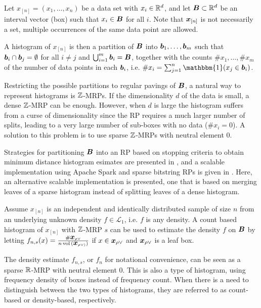 \documentclass[../mapped-regular-pavings.tex]{subfiles}
\begin{document}
  
  Let $x_{[n]} = (x_1, \dots, x_n)$ be a data set with $x_i \in \mathbb{R}^d$,
  and let $\B \subset \Rz^d$ be an interval vector (box) such that $x_i \in \B$ for all $i$.
  Note that $\x_{[n]}$ is not necessarily a set,
  multiple occurrences of the same data point are allowed.

  A histogram of $x_{[n]}$ is then a partition of $\B$ into $\b_1, \dots, \b_m$ such that
  $\b_i \cap \b_j = \emptyset$ for all $i \neq j$ and
  $\bigcup_{i = 1}^m \b_i = \B$,
  together with the counts $\#x_1, \dots, \#x_m$ of the number of data points in each $\b_i$,
  i.e. $\#x_i = \sum_{j=1}^n \mathbbm{1}(x_j \in \b_i)$.

  Restricting the possible partitions to regular pavings of $\B$,
  a natural way to represent histograms is $\mathbb{Z}$-MRPs.
  If the dimensionality $d$ of the data is small,
  a dense $\mathbb{Z}$-MRP can be enough.
  However, when $d$ is large the histogram suffers from a curse of dimensionality since
  the RP requires a much larger number of splits,
  leading to a very large number of sub-boxes with no data ($\#x_i = 0$).
  A solution to this problem is to use sparse $\mathbb{Z}$-MRPs with neutral element 0.

  Strategies for partitioning $\B$ into an RP based on stopping criteria 
  to obtain minimum distance histogram esimates are 
  presented in \cite{srp-mde-raaz-teng}, and 
  a scalable implementation using Apache Spark and sparse bitstring RPs is 
  given in \cite{scala-density-tree}.
  Here, an alternative scalable implementation is presented,
  one that is based on merging leaves of a sparse histogram instead
  of splitting leaves of a dense histogram.

  Assume $x_{[n]}$ is an independent and identically distributed sample of size $n$ from 
  an underlying unknown density $f \in \mathcal{L}_1$, i.e. $f$ is any density.
  A count based histogram of $x_{[n]}$ with 
  $\mathbb{Z}$-MRP $s$ can be used to estimate the density $f$ on $\B$ by
  letting 
  $f_{n, s}(x) = \frac{\#\x_{\rho \vee}}{n \, \vol (\x_{\rho \vee)})}$ if 
  $x \in \x_{\rho \vee}$ and $\x_{\rho \vee}$ is a leaf box.

  The density estimate $f_{n, s}$, or $f_n$ for notational convenience, 
  can be seen as a sparse $\mathbb{R}$-MRP with neutral element $0$.
  This is also a type of histogram, 
  using frequency density of boxes instead of frequency count.
  When there is a need to distinguish between the two types of histograms,
  they are referred to as count-based or density-based, respectively.
\end{document}
